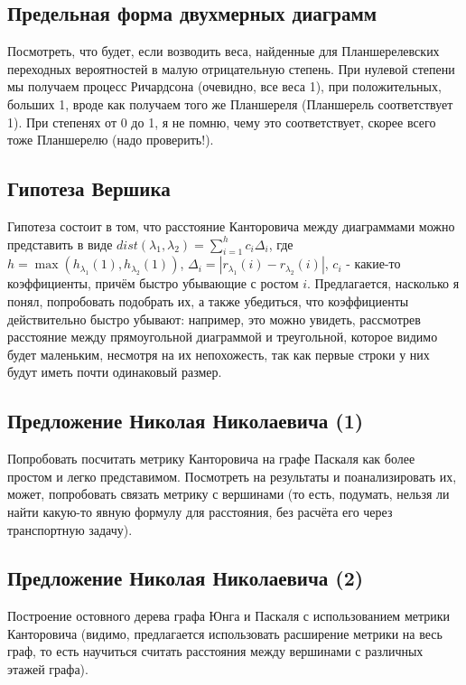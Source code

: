 \documentclass[12pt]{report}
\begin{document}
\subsection*{Предельная форма двухмерных диаграмм}

\hspace{\parindent} Посмотреть, что будет, если возводить веса, найденные для Планшерелевских переходных вероятностей в малую отрицательную степень. При нулевой степени мы получаем процесс Ричардсона (очевидно, все веса 1), при положительных, больших 1, вроде как получаем того же Планшереля (Планшерель соответствует 1). При степенях от 0 до 1, я не помню, чему это соответствует, скорее всего тоже Планшерелю (надо проверить!).

\subsection*{Гипотеза Вершика}
\hspace{\parindent} Гипотеза состоит в том, что расстояние Канторовича между диаграммами можно представить в виде $dist(\lambda_1, \lambda_2) = \sum\limits_{i=1}^{h}c_i\Delta_i$, где $h = \max(h_{\lambda_1}(1), h_{\lambda_2}(1))$, $\Delta_i = |r_{\lambda_1}(i) - r_{\lambda_2}(i)|$, $c_i$ - какие-то коэффициенты, причём быстро убывающие с ростом $i$. Предлагается, насколько я понял, попробовать подобрать их, а также убедиться, что коэффициенты действительно быстро убывают:  например, это можно увидеть, рассмотрев расстояние между прямоугольной диаграммой и треугольной, которое видимо будет маленьким, несмотря на их непохожесть, так как первые строки у них будут иметь почти одинаковый размер.

\subsection*{Предложение Николая Николаевича (1)}

\hspace{\parindent} Попробовать посчитать метрику Канторовича на графе Паскаля как более простом и легко представимом. Посмотреть на результаты и поанализировать их, может, попробовать связать метрику с вершинами (то есть, подумать, нельзя ли найти какую-то явную формулу для расстояния, без расчёта его через транспортную задачу).

\subsection*{Предложение Николая Николаевича (2)}

Построение остовного дерева графа Юнга и Паскаля с использованием метрики Канторовича (видимо, предлагается использовать расширение метрики на весь граф, то есть научиться считать расстояния между вершинами с различных этажей графа).
\end{document}
